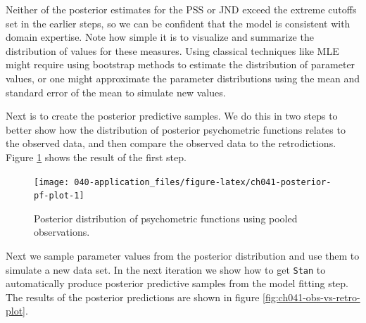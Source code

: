 \documentclass[11pt, oneside, openany]{scrbook}
\newenvironment{Shaded}{\begin{snugshade}}{\end{snugshade}}
\newcommand{\AttributeTok}[1]{\textcolor[rgb]{0.77,0.63,0.00}{#1}}
\newcommand{\ConstantTok}[1]{\textcolor[rgb]{0.00,0.00,0.00}{#1}}
\newcommand{\FunctionTok}[1]{\textcolor[rgb]{0.00,0.00,0.00}{#1}}
\newcommand{\NormalTok}[1]{#1}
\newcommand{\OtherTok}[1]{\textcolor[rgb]{0.56,0.35,0.01}{#1}}
\newcommand{\SpecialCharTok}[1]{\textcolor[rgb]{0.00,0.00,0.00}{#1}}
\begin{document}
Neither of the posterior estimates for the PSS or JND exceed the extreme cutoffs set in the earlier steps, so we can be confident that the model is consistent with domain expertise. Note how simple it is to visualize and summarize the distribution of values for these measures. Using classical techniques like MLE might require using bootstrap methods to estimate the distribution of parameter values, or one might approximate the parameter distributions using the mean and standard error of the mean to simulate new values.

Next is to create the posterior predictive samples. We do this in two steps to better show how the distribution of posterior psychometric functions relates to the observed data, and then compare the observed data to the retrodictions. Figure \ref{fig:ch041-posterior-pf-plot} shows the result of the first step.

\begin{figure}

{\centering \texttt{[image: 040-application\_files/figure-latex/ch041-posterior-pf-plot-1]} 

}

\caption{Posterior distribution of psychometric functions using pooled observations.}\label{fig:ch041-posterior-pf-plot}
\end{figure}

Next we sample parameter values from the posterior distribution and use them to simulate a new data set. In the next iteration we show how to get \texttt{Stan} to automatically produce posterior predictive samples from the model fitting step. The results of the posterior predictions are shown in figure \ref{fig:ch041-obs-vs-retro-plot}.


\begin{Shaded}
\end{Shaded}
\end{document}
